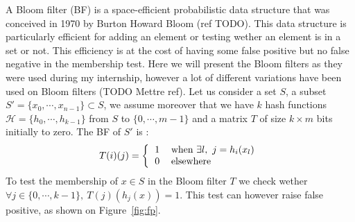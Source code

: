 A Bloom filter (BF) is a space-efficient probabilistic data structure that was conceived in 1970 by Burton Howard Bloom (ref TODO). This data structure is particularly efficient for adding an element or testing wether an element is in a set or not. This efficiency is at the cost of having some false positive but no false negative in the membership test. Here we will present the Bloom filters as they were used during my internship, however a lot of different variations have been used on Bloom filters (TODO Mettre ref). Let us consider a set $S$, a subset $S' = \{x_0,\cdots,x_{n-1}\} \subset S$, we assume moreover that we have $k$ hash functions $\mathcal{H}=\{h_0,\cdots,h_{k-1}\}$ from $S$ to $\{0,\cdots,m-1\}$ and a matrix $T$ of size $k \times m$ bits initially to zero. The BF of $S'$ is :
\begin{equation*}
T(i)(j) = \left \{ 
\begin{tabular}{c l} 
$1$ & when $\exists l,\ j = h_i(x_l)$ \\
0 & elsewhere
\end{tabular}
\right .
\end{equation*}
To test the membership of $x\in S$ in the Bloom filter $T$ we check wether $\forall j \in \{0,\cdots,k-1\},\ T(j)(h_j(x)) = 1$. This test can however raise 
false positive, as shown on Figure~\ref{fig:fp}.
